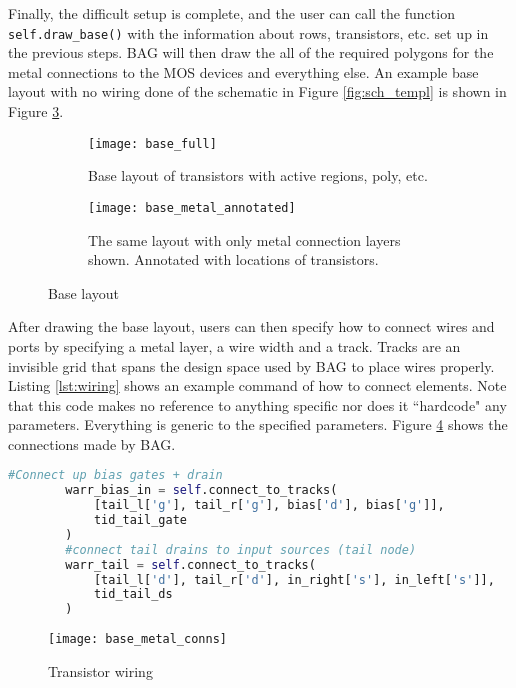 \clearpage
Finally, the difficult setup is complete, and the user can call the function \texttt{self.draw\_base()} with the information about rows, transistors, etc. set up in the previous steps. BAG will then draw the all of the required polygons for the metal connections to the MOS devices and everything else. An example base layout with no wiring done of the schematic in Figure \ref{fig:sch_templ} is shown in Figure \ref{fig:base_layout_metal}.
\begin{figure}[h]
\centering
\begin{subfigure}{.4\linewidth}
  \centering
  \texttt{[image: base\_full]}
  \caption{Base layout of transistors with active regions, poly, etc.}
  \label{fig:sfig1}
\end{subfigure}
\begin{subfigure}{.4\linewidth}
  \centering
\texttt{[image: base\_metal\_annotated]}
  \caption{The same layout with only metal connection layers shown. Annotated with locations of transistors.}
  \label{fig:sfig2}
\end{subfigure}
\caption{Base layout}
\label{fig:base_layout_metal}
\end{figure}
\clearpage
After drawing the base layout, users can then specify how to connect wires and ports by specifying a metal layer, a wire width and a track. Tracks are an invisible grid that spans the design space used by BAG to place wires properly. Listing \ref{lst:wiring} shows an example command of how to connect elements. Note that this code makes no reference to anything specific nor does it ``hardcode" any parameters. Everything is generic to the specified parameters. Figure \ref{fig:base_with_wires} shows the connections made by BAG.
\begin{lstlisting}[language=Python, caption=Drawing wire connections., label={lst:wiring}, float]
	      #Connect up bias gates + drain
        warr_bias_in = self.connect_to_tracks(
            [tail_l['g'], tail_r['g'], bias['d'], bias['g']],
            tid_tail_gate
        )
        #connect tail drains to input sources (tail node)
        warr_tail = self.connect_to_tracks(
            [tail_l['d'], tail_r['d'], in_right['s'], in_left['s']],
            tid_tail_ds
        )
\end{lstlisting}
\begin{figure}[h]
\centering
\texttt{[image: base\_metal\_conns]}
\caption{Transistor wiring}
\label{fig:base_with_wires}
\end{figure}


